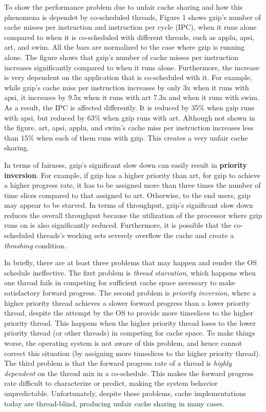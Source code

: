 \documentclass[a4paper,10pt]{article}
\begin{document}
\begin{multicols}{2}
To show the performance problem due to unfair cache sharing and how this phenomena is dependet by co-scheduled threads, Figure 1 shows
gzip's number of cache misses per instruction and instruction per cycle (IPC), when it runs alone compared to when it is co-scheduled with 
different threads, such as applu, apsi, art, and swim. All the bars are normalized to the case where gzip is running alone. The figure shows that gzip's 
number of cache misses per instruction increases significantly compared to when it runs alone. Furthermore, the increase is very dependent on the 
application that is co-scheduled with it. For example, while gzip's cache miss per instruction increases by only 3x when it runs with apsi, it 
increases by 9.5x when it runs with art 7.3x and when it runs with swim. As a result, the IPC is affected differently. It is reduced by
35$\%$ when gzip runs with apsi, but reduced by 63$\%$ when gzip runs with art. Although not shown in the figure, art, apsi, applu, 
and swim's cache miss per instruction increases less than 15$\%$ when each of them runs with gzip. This creates a very unfair cache sharing.

In terms of fairness, gzip's significant slow down can easily result in \textbf{priority inversion}. 
For example, if gzip has a higher priority than art, for gzip to achieve a higher progress rate, it has to be assigned more than three times the 
number of time slices compared to that assigned to art. Otherwise, to the end users, gzip may appear to be starved. In terms of throughput,
gzip's significant slow down reduces the overall throughput because the utilization of the processor where gzip runs on is also significantly reduced. 
Furthermore, it is possible that the co-scheduled threads's working sets severely overflow the cache and create a \textit{thrashing} condition.

In briefly, there are at least three problems that may happen and render the OS schedule ineffective.
The first problem is \textit{thread starvation}, which happens when one thread fails in competing for sufficient cache space necessary to make 
satisfactory forward progress. The second problem is \textit{priority inversion}, where a higher priority thread achieves a slower forward
progress than a lower priority thread, despite the attempt by the OS to provide more timeslices to the higher priority thread.
This happens when the higher priority thread loses to the lower priority thread (or other threads) in competing
for cache space. To make things worse, the operating system is not aware of this problem, and hence cannot correct this situation 
(by assigning more timeslices to the higher priority thread). The third problem is that the forward progress
rate of a thread is \textit{highly dependent} on the thread mix in a co-schedule. This makes the forward progress rate difficult
to characterize or predict, making the system behavior unpredictable. Unfortunately, despite these problems, cache implementations today are 
thread-blind, producing unfair cache sharing in many cases.


\end{multicols}
\end{document}
